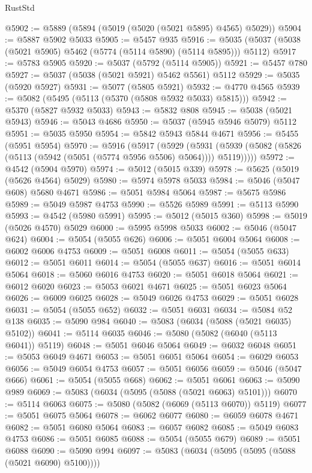 \begin{lexlean}{RustStd}
\begin{coremodule}
@5902 := @5889 (@5894 (@5019 (@5020 (@5021 @5895) @4565) @5029))
@5904 := @5887 @5902 @5033
@5905 := @5457 @935
@5916 := @5035 (@5037 (@5038 (@5021 @5905) @5462 (@5774 (@5114 @5890) (@5114 @5895))) @5112)
@5917 := @5783 @5905
@5920 := @5037 (@5792 (@5114 @5905))
@5921 := @5457 @780
@5927 := @5037 (@5038 (@5021 @5921) @5462 @5561) @5112
@5929 := @5035 (@5920 @5927)
@5931 := @5077 (@5805 @5921)
@5932 := @4770 @4565
@5939 := @5082 (@5495 (@5113 (@5370 (@5808 @5932 @5033) @5815)))
@5942 := @5370 (@5827 @5932 @5033)
@5943 := @5832 @808
@5945 := @5038 (@5021 @5943)
@5946 := @5043 @4686
@5950 := @5037 (@5945 @5946 @5079) @5112
@5951 := @5035 @5950
@5954 := @5842 @5943 @5844 @4671
@5956 := @5455 (@5951 @5954)
@5970 := @5916
    (@5917
      (@5929
        (@5931 (@5939 (@5082 (@5826 (@5113 (@5942 (@5051 (@5774 @5956 @5506) @5064)))) @5119)))))
@5972 := @4542 (@5904 @5970)
@5974 := @5012 (@5015 @339)
@5978 := @5625 (@5019 (@5626 @4564) @5029)
@5980 := @5974 @5978 @5033
@5984 := @5046 (@5047 @608) @5680 @4671
@5986 := @5051 @5984 @5064
@5987 := @5675 @5986
@5989 := @5049 @5987 @4753
@5990 := @5526 @5989
@5991 := @5113 @5990
@5993 := @4542 (@5980 @5991)
@5995 := @5012 (@5015 @360)
@5998 := @5019 (@5026 @4570) @5029
@6000 := @5995 @5998 @5033
@6002 := @5046 (@5047 @624)
@6004 := @5054 (@5055 @626)
@6006 := @5051 @6004 @5064
@6008 := @6002 @6006 @4753
@6009 := @5051 @6008
@6011 := @5054 (@5055 @633)
@6012 := @5051 @6011
@6014 := @5054 (@5055 @637)
@6016 := @5051 @6014 @5064
@6018 := @5060 @6016 @4753
@6020 := @5051 @6018 @5064
@6021 := @6012 @6020
@6023 := @5053 @6021 @4671
@6025 := @5051 @6023 @5064
@6026 := @6009 @6025
@6028 := @5049 @6026 @4753
@6029 := @5051 @6028
@6031 := @5054 (@5055 @652)
@6032 := @5051 @6031
@6034 := @5084 @52 @138
@6035 := @5090 @984
@6040 := @5083 (@6034 (@5088 (@5021 @6035) @5102))
@6041 := @5114 @6035
@6046 := @5080 (@5082 (@6040 (@5113 @6041)) @5119)
@6048 := @5051 @6046 @5064
@6049 := @6032 @6048
@6051 := @5053 @6049 @4671
@6053 := @5051 @6051 @5064
@6054 := @6029 @6053
@6056 := @5049 @6054 @4753
@6057 := @5051 @6056
@6059 := @5046 (@5047 @666)
@6061 := @5054 (@5055 @668)
@6062 := @5051 @6061
@6063 := @5090 @989
@6069 := @5083 (@6034 (@5095 (@5088 (@5021 @6063) @5101)))
@6070 := @5114 @6063
@6075 := @5080 (@5082 (@6069 (@5113 @6070)) @5119)
@6077 := @5051 @6075 @5064
@6078 := @6062 @6077
@6080 := @6059 @6078 @4671
@6082 := @5051 @6080 @5064
@6083 := @6057 @6082
@6085 := @5049 @6083 @4753
@6086 := @5051 @6085
@6088 := @5054 (@5055 @679)
@6089 := @5051 @6088
@6090 := @5090 @994
@6097 := @5083 (@6034 (@5095 (@5095 (@5088 (@5021 @6090) @5100))))

\end{coremodule}
\end{lexlean}
